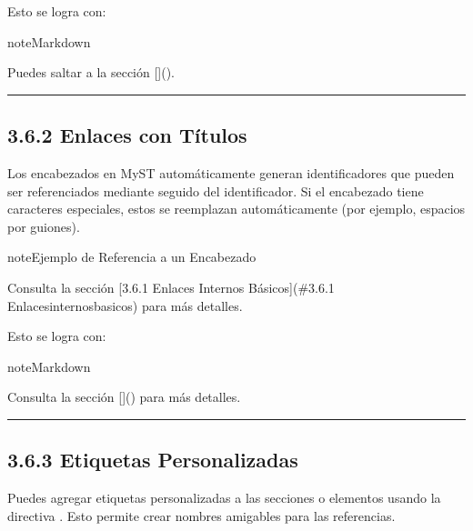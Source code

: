\documentclass[a4paper,10pt,spanish]{sphinxmanual}
\begin{document}
\sphinxAtStartPar
Esto se logra con:

\begin{sphinxadmonition}{note}{Markdown}

\begin{sphinxVerbatim}[commandchars=\\\{\}]
Puedes saltar a la sección []().
\end{sphinxVerbatim}
\end{sphinxadmonition}


\bigskip\hrule\bigskip



\subsection{3.6.2 Enlaces con Títulos}
\label{\detokenize{3_guia_myst/cross_references:enlaces-con-titulos}}
\sphinxAtStartPar
Los encabezados en MyST automáticamente generan identificadores que pueden ser referenciados mediante \sphinxcode{\sphinxupquote{\#}} seguido del identificador. Si el encabezado tiene caracteres especiales, estos se reemplazan automáticamente (por ejemplo, espacios por guiones).

\begin{sphinxadmonition}{note}{Ejemplo de Referencia a un Encabezado}

\sphinxAtStartPar
Consulta la sección {[}3.6.1 Enlaces Internos Básicos{]}(\#3.6.1 Enlaces\sphinxhyphen{}internos\sphinxhyphen{}basicos) para más detalles.
\end{sphinxadmonition}

\sphinxAtStartPar
Esto se logra con:

\begin{sphinxadmonition}{note}{Markdown}

\begin{sphinxVerbatim}[commandchars=\\\{\}]
Consulta la sección []() para más detalles.
\end{sphinxVerbatim}
\end{sphinxadmonition}


\bigskip\hrule\bigskip



\subsection{3.6.3 Etiquetas Personalizadas}
\label{\detokenize{3_guia_myst/cross_references:etiquetas-personalizadas}}
\sphinxAtStartPar
Puedes agregar etiquetas personalizadas a las secciones o elementos usando la directiva . Esto permite crear nombres amigables para las referencias.
\end{document}
